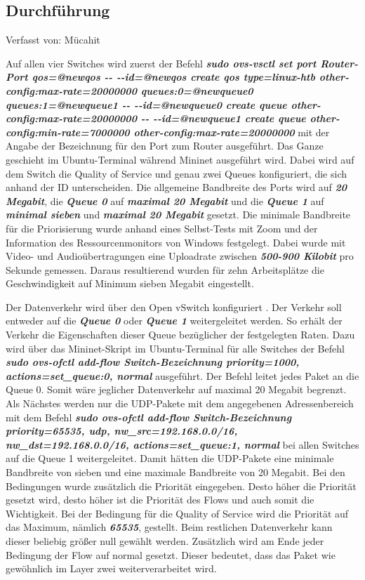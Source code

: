 \documentclass[fontsize=12pt,paper=a4,open=any,parskip=half,
  twoside=false,toc=listof,toc=bibliography,fleqn,leqno,
  captions=nooneline,captions=tableabove,british]{scrbook}
\begin{document}
\subsection{Durchführung}
{\tiny Verfasst von: Mücahit\par}
Auf allen vier Switches wird zuerst der Befehl \textit{\textbf{sudo ovs\hyp{}vsctl set port Router\hyp{}Port qos=@newqos \hyp{}\hyp{} \hyp{}\hyp{}id=@newqos create qos type=linux\hyp{}htb other\hyp{}config:max\hyp{}rate=20000000 queues:0=@newqueue0 queues:1=@newqueue1 \hyp{}\hyp{} \hyp{}\hyp{}id=@newqueue0 create queue other\hyp{}config:max\hyp{}rate=20000000 \hyp{}\hyp{} \hyp{}\hyp{}id=\linebreak{}@newqueue1 create queue other\hyp{}config:min\hyp{}rate=7000000 other\hyp{}config:max\hyp{}rate=20000000}} mit der Angabe der Bezeichnung für den Port zum Router ausgeführt. Das Ganze geschieht im Ubuntu\hyp{}Terminal während Mininet ausgeführt wird. Dabei wird auf dem Switch die Quality of Service und genau zwei Queues konfiguriert, die sich anhand der ID unterscheiden. Die allgemeine Bandbreite des Ports wird auf \textit{\textbf{20 Megabit}}, die \textit{\textbf{Queue 0}} auf \textit{\textbf{maximal 20 Megabit}} und die \textit{\textbf{Queue 1}} auf \textit{\textbf{minimal sieben}} und \textit{\textbf{maximal 20 Megabit}} gesetzt. Die minimale Bandbreite für die Priorisierung wurde anhand eines Selbst\hyp{}Tests mit Zoom und der Information des Ressourcenmonitors von Windows festgelegt. Dabei wurde mit Video\hyp{} und Audioübertragungen eine Uploadrate zwischen \textit{\textbf{500\hyp{}900 Kilobit}} pro Sekunde gemessen. Daraus resultierend wurden für zehn Arbeitsplätze die Geschwindigkeit auf Minimum sieben Megabit eingestellt.\par
Der Datenverkehr wird über den Open vSwitch konfiguriert \cite{qospolicy}. Der Verkehr soll entweder auf die \textit{\textbf{Queue 0}} oder \textit{\textbf{Queue 1}} weitergeleitet werden. So erhält der Verkehr die Eigenschaften dieser Queue bezüglicher der festgelegten Raten. Dazu wird über das Mininet-Skript im Ubuntu-Terminal für alle Switches der Befehl \textit{\textbf{sudo ovs\hyp{}ofctl add\hyp{}flow Switch-Bezeichnung priority=1000, actions=set\_queue:0, normal}} ausgeführt. Der Befehl leitet jedes Paket an die Queue 0. Somit wäre jeglicher Datenverkehr auf maximal 20 Megabit begrenzt. Als Nächstes werden nur die UDP-Pakete mit dem angegebenen Adressenbereich mit dem Befehl \textit{\textbf{sudo ovs\hyp{}ofctl add\hyp{}flow Switch\hyp{}Bezeichnung priority=65535, udp, nw\_src=192.168.0.0/16, nw\_dst=192.168.0.0/16, actions=set\_queue:1, normal}} bei allen Switches auf die Queue 1 weitergeleitet. Damit hätten die UDP-Pakete eine minimale Bandbreite von sieben und eine maximale Bandbreite von 20 Megabit. Bei den Bedingungen wurde zusätzlich die Priorität eingegeben. Desto höher die Priorität gesetzt wird, desto höher ist die Priorität des Flows und auch somit die Wichtigkeit. Bei der Bedingung für die Quality of Service wird die Priorität auf das Maximum, nämlich \textit{\textbf{65535}}, gestellt. Beim restlichen Datenverkehr kann dieser beliebig größer null gewählt werden. Zusätzlich wird am Ende jeder Bedingung der Flow auf normal gesetzt. Dieser bedeutet, dass das Paket wie gewöhnlich im Layer zwei weiterverarbeitet wird.
\end{document}

